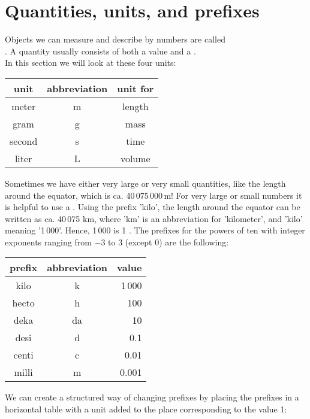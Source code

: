 





\section{Quantities, units, and prefixes}
Objects we can measure and describe by numbers are called \\. A quantity usually consists of both a value and a . \\In this section we will look at these four units:
\tbs
\begin{center}
	\begin{tabular}{c|c|c}
		\textbf{unit} & \textbf{abbreviation} &\textbf{unit for}\\ \hline
		meter & m &length\\\hline
		gram & g &mass\\\hline
		second & s & time\\\hline 
		liter & L & volume
	\end{tabular}
\end{center}\tbs
Sometimes we have either very large or very small quantities, like the length around the equator, which is ca. 40\,075\,000\,m! For very large or small numbers it is helpful to use a . Using the prefix 'kilo', the length around the equator can be written as ca. 40\,075 km, where 'km' is an abbreviation for 'kilometer', and 'kilo' meaning '1\,000'. Hence, 1\,000 is 1 . The prefixes for the powers of ten with integer exponents ranging from $ -3 $ to 3 (except 0) are the following:\tbs
\begin{center}
	\begin{tabular}{c|c|r}
		\textbf{prefix} & \textbf{abbreviation}&\textbf{value} \\ \hline
		kilo & k & 1\,000\phantom{000\;}\\\hline
		hecto & h & 100\phantom{000\;}\\\hline
		deka & da & 10\phantom{000\;}\\\hline
		desi & d & 0.1\phantom{0\,\;}\\\hline
		centi & c & 0.01\phantom{\,\;}\\\hline
		milli & m & 0.001\\\hline		
	\end{tabular}
\end{center}
\newpage
We can create a structured way of changing prefixes by placing the prefixes in a horizontal table with a unit added to the place corresponding to the value 1: \regv

